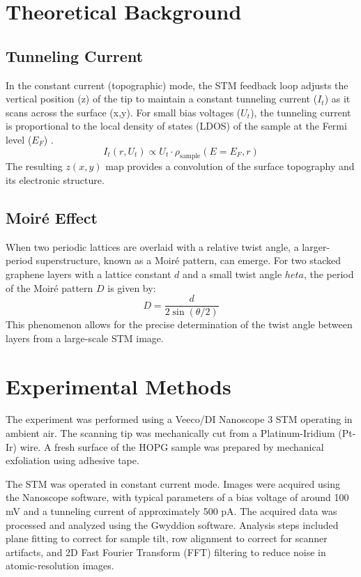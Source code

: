 \documentclass[12pt,a4paper]{article}
\begin{document}
\section{Theoretical Background}
\subsection{Tunneling Current}
In the constant current (topographic) mode, the STM feedback loop adjusts the vertical position (z) of the tip to maintain a constant tunneling current ($I_t$) as it scans across the surface (x,y). For small bias voltages ($U_t$), the tunneling current is proportional to the local density of states (LDOS) of the sample at the Fermi level ($E_F$) \cite{stm_manual}.
\begin{equation}
    I_t(r, U_t) \propto U_t \cdot \rho_{\text{sample}}(E = E_F, r)
\end{equation}
The resulting $z(x,y)$ map provides a convolution of the surface topography and its electronic structure.

\subsection{Moiré Effect}
When two periodic lattices are overlaid with a relative twist angle, a larger-period superstructure, known as a Moiré pattern, can emerge. For two stacked graphene layers with a lattice constant $d$ and a small twist angle $	heta$, the period of the Moiré pattern $D$ is given by:
\begin{equation}
    D = \frac{d}{2 \sin(\theta/2)}
    \label{eq:moire}
\end{equation}
This phenomenon allows for the precise determination of the twist angle between layers from a large-scale STM image.

\section{Experimental Methods}
The experiment was performed using a Veeco/DI Nanoscope 3 STM operating in ambient air. The scanning tip was mechanically cut from a Platinum-Iridium (Pt-Ir) wire. A fresh surface of the HOPG sample was prepared by mechanical exfoliation using adhesive tape.

The STM was operated in constant current mode. Images were acquired using the Nanoscope software, with typical parameters of a bias voltage of around 100 mV and a tunneling current of approximately 500 pA. The acquired data was processed and analyzed using the Gwyddion software. Analysis steps included plane fitting to correct for sample tilt, row alignment to correct for scanner artifacts, and 2D Fast Fourier Transform (FFT) filtering to reduce noise in atomic-resolution images.
\end{document}
